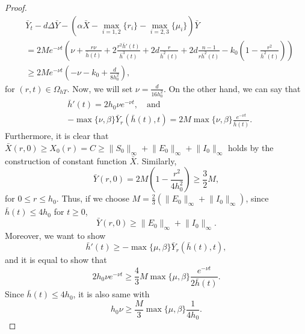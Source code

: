 \documentclass[11pt]{amsart}
\numberwithin{equation}{section}
\theoremstyle{plain}
\theoremstyle{definition}
\begin{document}
\begin{proof}
	\begin{equation*}
	\begin{aligned}
		&\bar Y_t-d\Delta \bar Y-(\alpha \bar X-\max\limits_{i=1,2}\{r_i\}-\max\limits_{i=2,3}\{\mu_i\})\bar Y \\
		&= 2Me^{-\nu t}\left(\nu+\frac{r\nu}{\bar h(t)}+2\frac{r^2 \bar h'(t)}{\bar h ^3(t)}+2d\frac{r}{\bar h^2(t)}+2d\frac{n-1}{r\bar h^2(t)}-k_0\left(1-\frac{r^2}{\bar h^2(t)}\right)\right)\\
		&\geq 2Me^{-\nu t}\left(-\nu -k_0 +\frac{d}{8h_0^2}\right),
	\end{aligned}
	\end{equation*}
	for $(r,t) \in \Omega_{hT}$. Now, we will set $\nu =\frac{d}{16h_0^2}$. On the other hand, we can say that
	\begin{equation*}
	\begin{aligned}
		&\bar h'(t)=2h_0\nu e^{-\nu t}, \quad \text{and}\\
		&-\max\{\nu,\beta\}\bar Y_r(\bar h(t),t)=2M\max \{\nu,\beta\}\frac{e^{-\nu t}}{\bar h(t)}.
	\end{aligned}
	\end{equation*}
	Furthermore, it is clear that $\bar{X}(r,0)\geq X_0(r)=C\geq \lVert S_0 \rVert_\infty + \lVert E_0 \rVert_\infty+\lVert I_0 \rVert_\infty$ holds by the construction of constant function $\bar X$. Similarly,
	\begin{equation*}
		\bar Y (r,0)=2M\left(1-\frac{r^2}{4h_0^2}\right)\geq \frac{3}{2}M,
	\end{equation*}
	for $0\leq r \leq h_0$. Thus, if we choose $M=\frac{2}{3}(\lVert E_0 \rVert_\infty + \lVert I_0 \rVert_\infty)$, since $\bar h(t) \leq 4h_0$ for $t\geq 0$,
	\begin{equation*}
		\bar Y (r,0) \geq \lVert E_0 \rVert_\infty + \lVert I_0\rVert _\infty.
	\end{equation*}
	Moreover, we want to show
	\begin{equation*}
		\bar h'(t) \geq -\max \{ \mu, \beta \} \bar Y_r(\bar h(t),t),
	\end{equation*}
	and it is equal to show that
	\begin{equation*}
		2h_0\nu e^{-\nu t} \geq \frac{4}{3}M\max\{\mu,\beta\}\frac{e^{-\nu t}}{2\bar h(t)}.
	\end{equation*}
	Since $\bar h(t) \leq 4 h_0$, it is also same with
	\begin{equation*}
		h_0 \nu \geq \frac{M}{3} \max \{ \mu,\beta \} \frac{1}{4 h_0}.
	\end{equation*}

\end{proof}
\end{document}
